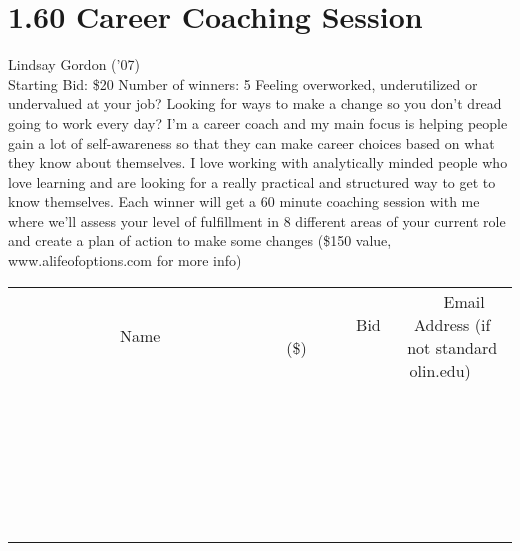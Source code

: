 \documentclass[11pt]{article}
\begin{document}
\section*{1.60 Career Coaching Session}
Lindsay Gordon ('07)
\\
Starting Bid: \$20
\newline
Number of winners: 5
\newline
Feeling overworked, underutilized or undervalued at your job? Looking for ways to make a change so you don't dread going to work every day? I'm a career coach and my main focus is helping people gain a lot of self-awareness so that they can make career choices based on what they know about themselves. I love working with analytically minded people who love learning and are looking for a really practical and structured way to get to know themselves. Each winner will get a 60 minute coaching session with me where we'll assess your level of fulfillment in 8 different areas of your current role and create a plan of action to make some changes (\$150 value, www.alifeofoptions.com for more info)
\\[6ex]
\begin{tabular}{c c c}
~~~~~~~~~~~~~Name~~~~~~~~~~~~~ & ~~~~~~~~~Bid (\$)~~~~~~~~~  & ~~~Email Address (if not standard olin.edu)~~~\\
 & & \\
\hline
 & & \\
\hline
 & & \\
\hline
 & & \\
\hline
 & & \\
\hline
 & & \\
\hline
 & & \\
\hline
 & & \\
\hline
 & & \\
\hline
 & & \\
\hline
 & & \\
\hline
 & & \\
\hline
 & & \\
\hline
 & & \\
\hline
 & & \\
\hline
 & & \\
\hline
 & & \\
\hline
 & & \\
\hline
 & & \\
\hline
 & & \\
\hline
 & & \\
\hline
 & & \\
\hline
 & & \\
\hline
 & & \\
\hline
 & & \\
\hline
 & & \\
\hline
\end{tabular}
\newpage
\end{document}
